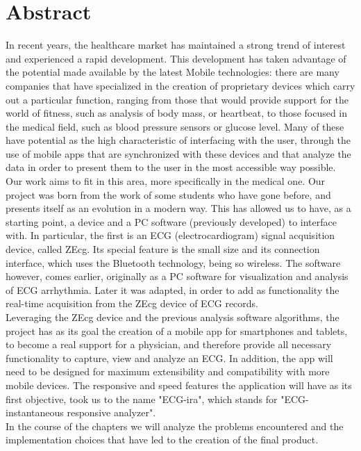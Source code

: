 \chapter{Abstract}

In recent years, the healthcare market has maintained a strong trend of interest and experienced a rapid development. This development has taken advantage of the potential made available by the latest Mobile technologies: there are many companies that have specialized in the creation of proprietary devices which carry out a particular function, ranging from those that would provide support for the world of fitness, such as analysis of body mass, or heartbeat, to those focused in the medical field, such as blood pressure sensors or glucose level. Many of these have potential as the high characteristic of interfacing with the user, through the use of mobile apps that are synchronized with these devices and that analyze the data in order to present them to the user in the most accessible way possible.\\
Our work aims to fit in this area, more specifically in the medical one. Our project was born from the work of some students who have gone before, and presents itself as an evolution in a modern way. This has allowed us to have, as a starting point, a device and a PC software (previously developed) to interface with. In particular, the first is an ECG (electrocardiogram) signal acquisition device, called ZEcg. Its special feature is the small size and its connection interface, which uses the Bluetooth technology, being so wireless.  The software however, comes earlier, originally as a PC software for visualization and analysis of ECG arrhythmia. Later it was adapted, in order to add as functionality the real-time acquisition from the ZEcg device of ECG records.\\
Leveraging the ZEcg device and the previous analysis software algorithms, the project has as its goal the creation of a mobile app for smartphones and tablets, to become a real support for a physician, and therefore provide all necessary functionality to capture, view and analyze an ECG. In addition, the app will need to be designed for maximum extensibility and compatibility with more mobile devices. The responsive and speed features the application will have as its first objective, took us to the name "ECG-ira", which stands for "ECG-instantaneous responsive analyzer".\\
In the course of the chapters we will analyze the problems encountered and the implementation choices that have led to the creation of the final product.